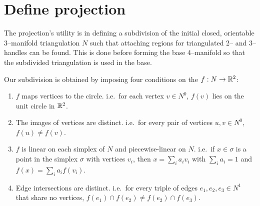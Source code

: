 \section{Define projection}

The projection's utility is in defining a subdivision of the initial closed, orientable 3--manifold triangulation $N$ such that attaching regions for triangulated 2-- and 3--handles can be found.
This is done before forming the base 4--manifold so that the subdivided triangulation is used in the base.

Our subdivision is obtained by imposing four conditions on the $f:N\to\mathbb{R}^2$:
\begin{enumerate}
	\item $f$ maps vertices to the circle.  i.e.\ for each vertex $v\in N^0$, $f(v)$ lies on the unit circle in $\mathbb{R}^2$.
	
	\item The images of vertices are distinct.  i.e.\ for every pair of vertices $u,v\in N^0$, $f(u)\neq f(v)$.
	
	\item $f$ is linear on each simplex of $N$ and piecewise-linear on $N$.  i.e.\ if $x\in\sigma$ is a point in the simplex $\sigma$ with vertices $v_i$, then $x=\sum_i a_i v_i$ with $\sum_i a_i = 1$ and $f(x) = \sum_i a_i f(v_i)$.
	
	\item Edge intersections are distinct. i.e.\ for every triple of edges $e_1, e_2, e_3\in N^1$ that share no vertices, $f(e_1)\cap f(e_2)\neq f(e_2)\cap f(e_3)$.
\end{enumerate}
